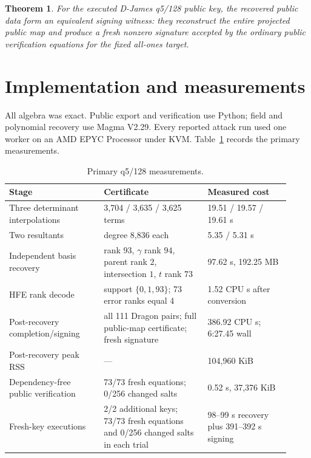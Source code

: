 \documentclass[10pt,a4paper]{article}
\newtheorem{theorem}{Theorem}
\begin{document}
\begin{theorem}
For the executed D-James q5/128 public key, the recovered public data form an
equivalent signing witness: they reconstruct the entire projected public map
and produce a fresh nonzero signature accepted by the ordinary public
verification equations for the fixed all-ones target.
\end{theorem}

\section{Implementation and measurements}

All algebra was exact.  Public export and verification use Python; field and
polynomial recovery use Magma V2.29.  Every reported attack run used one
worker on an AMD EPYC Processor under KVM.  Table~\ref{tab:measurements}
records the primary measurements.

\begin{table}[ht]
\centering
\small
\begin{tabular}{@{}p{0.31\linewidth}p{0.34\linewidth}p{0.27\linewidth}@{}}
\toprule
Stage & Certificate & Measured cost\\
\midrule
Three determinant interpolations & 3,704 / 3,635 / 3,625 terms
  & 19.51 / 19.57 / 19.61 s\\
Two resultants & degree 8,836 each & 5.35 / 5.31 s\\
Independent basis recovery & rank $93$, $\gamma$ rank $94$, parent rank $2$,
intersection $1$, $t$ rank $73$ & 97.62 s, 192.25 MB\\
HFE rank decode & support $\{0,1,93\}$; 73 error ranks equal 4
  & 1.52 CPU s after conversion\\
Post-recovery completion/signing & all 111 Dragon pairs; full public-map
certificate; fresh signature & 386.92 CPU s; 6:27.45 wall\\
Post-recovery peak RSS & --- & 104,960 KiB\\
Dependency-free public verification & 73/73 fresh equations; 0/256 changed
salts & 0.52 s, 37,376 KiB\\
Fresh-key executions & 2/2 additional keys; 73/73 fresh equations and 0/256
changed salts in each trial & 98--99 s recovery plus 391--392 s signing\\
\bottomrule
\end{tabular}
\caption{Primary q5/128 measurements.}
\label{tab:measurements}
\end{table}
\end{document}
